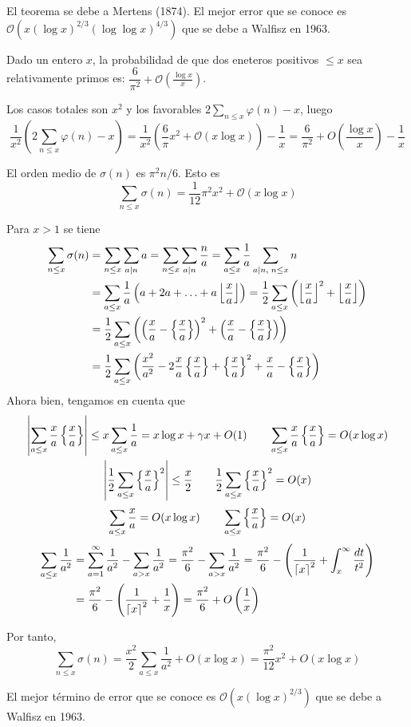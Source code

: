 \documentclass[TAN.tex]{subfiles}
\begin{document}
El teorema se debe a Mertens (1874). El mejor error que se conoce es $\mathcal{O}(x(\log x)^{2/3}(\log \log x)^{4/3})$ que se debe a Walfisz en 1963.

\begin{coro} Dado un entero $x$, la probabilidad de que dos eneteros positivos $≤x$ sea relativamente primos es: $\dfrac{6}{π^2}+ \mathcal{O}\left(\frac{\log x}{x}\right)$.
\end{coro}
\begin{dem}
Los casos totales son $x^2$ y los favorables $2\sum_{n\leq x} \varphi(n) -x$, luego
$$
\frac{1}{x^2}\left(2\sum_{n\leq x} \varphi(n) -x\right) =\frac{1}{x^2}\left( \frac{6}{π}x^2 + \mathcal{O}(x\log x)\right) - \frac{1}{x} = \frac{6}{\pi^2} + O\left(\frac{\log x}{x}\right)-\frac{1}{x}
$$
\end{dem}
\begin{prop}
El orden medio de $σ(n)$ es $π^2n/6$. Esto es
\[ \sum_{n≤x} σ(n) = \frac{1}{12} π^2x^2 + \mathcal{O}(x\log x) \]
\end{prop}
\begin{dem}
Para $x>1$ se tiene
\begin{align*}
\sum_{n\leq x} \sigma(n)&=\sum_{n\leq x}\sum_{a\mid n} a = \sum_{n\leq x}\sum_{a\mid n} \frac{n}{a} = \sum_{a\leq x} \frac{1}{a}\sum_{a\mid n,\; n\leq x} n \\
&= \sum_{a\leq x}\frac{1}{a}\left(a+2a+\dotsc+a\left\lfloor{\frac{x}{a}}\right\rfloor\right) =\frac{1}{2}\sum_{a\leq x}\left(\left\lfloor{\frac{x}{a}}\right\rfloor^2+\left\lfloor{\frac{x}{a}}\right\rfloor\right)\\
&=\frac{1}{2}\sum_{a\leq x}\left(\left(\frac{x}{a} - \left\{{\frac{x}{a}}\right\}\right)^2+\left(\frac{x}{a} - \left\{{\frac{x}{a}}\right\}\right)\right)\\
&=\frac{1}{2}\sum_{a\leq x}\left(\frac{x^2}{a^2} - 2\frac{x}{a}\left\{{\frac{x}{a}}\right\} +\left\{{\frac{x}{a}}\right\}^2 +\frac{x}{a}-\left\{{\frac{x}{a}}\right\}\right)
\end{align*}
Ahora bien, tengamos en cuenta que
\begin{gather*}
\left|\sum_{a\leq x}\frac{x}{a}\left\{{\frac{x}{a}}\right\}\right|\leq x\sum_{a\leq x}\frac{1}{a} = x\log x + \gamma x + O(1)  \qquad
\sum_{a\leq x}\frac{x}{a}\left\{{\frac{x}{a}}\right\} = O(x\log x)\\
\left|\frac{1}{2}\sum_{a\leq x}\left\{{\frac{x}{a}}\right\}^2\right|\leq\frac{x}{2} \qquad\frac{1}{2}\sum_{a\leq x}\left\{{\frac{x}{a}}\right\}^2 = O(x)
\end{gather*}
$$
\sum_{a\leq x}\frac{x}{a} = O(x\log x) \qquad
\sum_{a\leq x}\left\{{\frac{x}{a}}\right\} = O(x)
$$
\begin{align*}
\sum_{a\leq x}\frac{1}{a^2}& =\sum_{a=1}^\infty \frac{1}{a^2}- \sum_{a> x}\frac{1}{a^2} = \frac{\pi^2}{6}- \sum_{a> x}\frac{1}{a^2} =\frac{\pi^2}{6}- \left(\frac{1}{\left\lceil{x}\right\rceil^2}+\int_x^\infty \frac{dt}{t^2}\right) \\
&= \frac{\pi^2}{6}-\left(\frac{1}{\left\lceil{x}\right\rceil^2}+\frac{1}{x}\right) = \frac{\pi^2}{6} + O\left(\frac{1}{x}\right)
\end{align*}

Por tanto,
$$
\sum_{n\leq x} \sigma(n) = \frac{x^2}{2}\sum_{a\leq x}\frac{1}{a^2}+O(x\log x) = \frac{\pi^2}{12}x^2+O(x\log x )
$$
\end{dem}
El mejor término de error que se conoce es $\mathcal{O}(x(\log x)^{2/3})$ que se debe a Walfisz en 1963.
\end{document}

